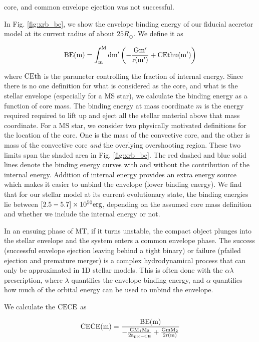 \documentclass[linenumbers,trackchanges,twocolumn]{aastex701}
\begin{document}
core, and common envelope ejection was not successful. 

In Fig. \ref{fig:xrb_be}, we show the envelope binding energy of our fiducial accretor model at its current radius of about $25R_{\odot}$. We define it as 

\begin{equation}
    \rm BE(m) = \int_m^M dm' \left(-\frac{Gm'}{r(m')} + \alpha_{\rm th}u(m')\right)
\end{equation}

where $\alpha_{\rm th}$ is the parameter controlling the fraction of internal energy. Since there is no one definition for what is considered as the core, and what is the stellar envelope (especially for a MS star), we calculate the binding energy as a function of core mass. The binding energy at mass coordinate $m$ is the energy required required to lift up and eject all the stellar material above that mass coordinate. For a MS star, we consider two physically motivated definitions for the location of the core. One is the mass of the convective core, and the other is mass of the convective core \textit{and} the overlying overshooting region. These two limits span the shaded area in Fig. \ref{fig:xrb_be}. The red dashed and blue solid lines denote the binding energy curves with and without the contribution of the internal energy. Addition of internal energy provides an extra energy source which makes it easier to unbind the envelope (lower binding energy). We find that for our stellar model at its current evolutionary state, the binding energies lie between $[2.5-5.7] \times 10^{50} \rm erg$, depending on the assumed core mass definition and whether we include the internal energy or not. 

In an ensuing phase of MT, if it turns unstable, the compact object plunges into the stellar envelope and the system enters a common envelope phase. The success (successful envelope ejection leaving behind a tight binary) or failure (pfailed ejection and premature merger) is a complex hydrodynamical process that can only be approximated in 1D stellar models. This is often done with the $\alpha \lambda$ prescription, where $\lambda$ quantifies the envelope binding energy, and $\alpha$ quantifies how much of the orbital energy can be used to unbind the envelope. 

We calculate the $\alpha_{\rm CE}$ as

\begin{equation}
    \alpha_{\rm CE} \def \alpha_{\rm CE}(m) = \frac{\rm BE(m)}{-\frac{\rm GM_1 M_2}{2a_{\rm pre-CE}} + \frac{\rm Gm M_2}{2r(m)}}
\end{equation}
\end{document}
